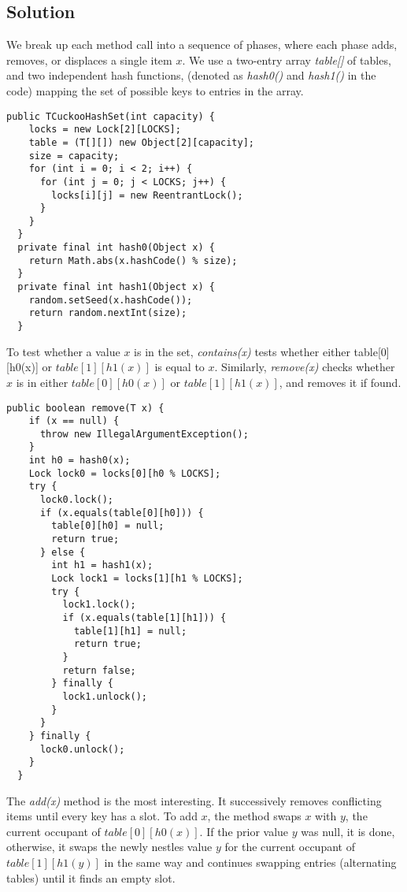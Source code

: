 \subsection{Solution}
\par
We break up each method call into a sequence of phases, where each phase adds, removes, or displaces a single item $x$.
We use a two-entry array \textit{table[]} of tables, and two independent hash functions, (denoted as \textit{hash0()} and \textit{hash1()} in the code) mapping the set of possible keys to entries in the array. 
\par
\begin{lstlisting}[frame=single,breaklines=true]
  public TCuckooHashSet(int capacity) {
    locks = new Lock[2][LOCKS];
    table = (T[][]) new Object[2][capacity];
    size = capacity;
    for (int i = 0; i < 2; i++) {
      for (int j = 0; j < LOCKS; j++) {
        locks[i][j] = new ReentrantLock();
      }
    }
  }
  private final int hash0(Object x) {
    return Math.abs(x.hashCode() % size);
  }
  private final int hash1(Object x) {
    random.setSeed(x.hashCode());
    return random.nextInt(size);
  }
\end{lstlisting}
\par
To test whether a value $x$ is in the set, \textit{contains(x)} tests whether either table[0][h0(x)] or $table[1][h1(x)]$ is equal to $x$. Similarly, \textit{remove(x)} checks whether $x$ is in either $table[0][h0(x)]$ or $table[1][h1(x)]$, and removes it if found.
\begin{lstlisting}[frame=single,breaklines=true]
  public boolean remove(T x) {
    if (x == null) {
      throw new IllegalArgumentException();
    }
    int h0 = hash0(x);
    Lock lock0 = locks[0][h0 % LOCKS];
    try {
      lock0.lock();
      if (x.equals(table[0][h0])) {
        table[0][h0] = null;
        return true;
      } else {
        int h1 = hash1(x);
        Lock lock1 = locks[1][h1 % LOCKS];
        try {
          lock1.lock();
          if (x.equals(table[1][h1])) {
            table[1][h1] = null;
            return true;
          }
          return false;
        } finally {
          lock1.unlock();
        }
      }
    } finally {
      lock0.unlock();
    }
  }
\end{lstlisting}
\par
The \textit{add(x)} method is the most interesting. It successively removes conflicting items until every key has a slot. To add $x$, the method swaps $x$ with $y$, the current occupant of $table[0][h0(x)]$. If the prior value $y$ was null, it is done, otherwise, it swaps the newly nestles value $y$ for the current occupant of $table[1][h1(y)]$ in the same way and continues swapping entries (alternating tables) until it finds an empty slot.


